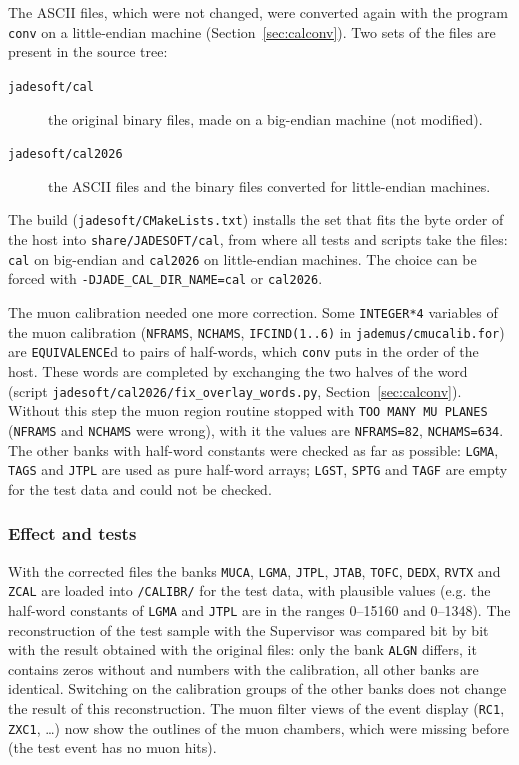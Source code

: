 The ASCII files, which were not changed, were converted again with the program \texttt{conv} on a
little-endian machine (Section~\ref{sec:calconv}). Two sets of the files are present in the source tree:
\begin{description}
\item[\texttt{jadesoft/\allowbreak{}cal}] the original binary files, made on a big-endian machine (not modified).
\item[\texttt{jadesoft/\allowbreak{}cal2026}] the ASCII files and the binary files converted for little-endian machines.
\end{description}
The build (\texttt{jadesoft/\allowbreak{}CMakeLists.txt}) installs the set that fits the byte order of the host
into \texttt{share/\allowbreak{}JADESOFT/\allowbreak{}cal}, from where all tests and scripts take the files: \texttt{cal} on
big-endian and \texttt{cal2026} on little-endian machines. The choice can be forced with
\texttt{-DJADE\_\allowbreak{}CAL\_\allowbreak{}DIR\_\allowbreak{}NAME=cal} or \texttt{cal2026}.

The muon calibration needed one more correction. Some \texttt{INTEGER*4} variables of the muon
calibration (\texttt{NFRAMS}, \texttt{NCHAMS}, \texttt{IFCIND(1..6)} in \texttt{jademus/\allowbreak{}cmucalib.for})
are \texttt{EQUIVALENCE}d to pairs of half-words, which \texttt{conv} puts in the order of the host. These
words are completed by exchanging the two halves of the word (script
\texttt{jadesoft/\allowbreak{}cal2026/\allowbreak{}fix\_\allowbreak{}overlay\_\allowbreak{}words.py}, Section~\ref{sec:calconv}). Without this step the
muon region routine stopped with \texttt{TOO MANY MU PLANES} (\texttt{NFRAMS} and \texttt{NCHAMS} were
wrong), with it the values are \texttt{NFRAMS=82}, \texttt{NCHAMS=634}. The other banks with half-word
constants were checked as far as possible: \texttt{LGMA}, \texttt{TAGS} and \texttt{JTPL} are used as
pure half-word arrays; \texttt{LGST}, \texttt{SPTG} and \texttt{TAGF} are empty for the test data and
could not be checked.

\subsubsection{Effect and tests}

With the corrected files the banks \texttt{MUCA}, \texttt{LGMA}, \texttt{JTPL}, \texttt{JTAB},
\texttt{TOFC}, \texttt{DEDX}, \texttt{RVTX} and \texttt{ZCAL} are loaded into \texttt{/CALIBR/} for the
test data, with plausible values (e.g. the half-word constants of \texttt{LGMA} and \texttt{JTPL} are
in the ranges 0--15160 and 0--1348). The reconstruction of the test sample with the Supervisor
was compared bit by bit with the result obtained with the original files: only the bank \texttt{ALGN}
differs, it contains zeros without and numbers with the calibration, all other banks are identical.
Switching on the calibration groups of the other banks does not change the result of this
reconstruction. The muon filter views of the event display (\texttt{RC1}, \texttt{ZXC1}, \dots) now
show the outlines of the muon chambers, which were missing before (the test event has no muon hits).

